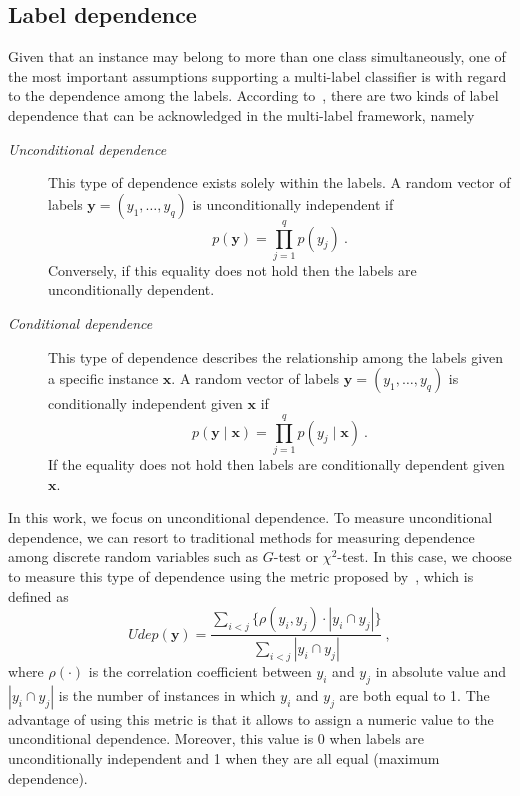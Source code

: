\documentclass[review]{elsarticle}
\begin{document}
	\subsection{Label dependence}
	
	Given that an instance may belong to more than one class simultaneously, one of the most important assumptions supporting a multi-label classifier is with regard to the dependence among the labels. According to~\citet{EG1}, there are two kinds of label dependence that can be acknowledged in the multi-label framework, namely
	\begin{description}
		\item[\it Unconditional dependence] This type of dependence exists solely within the labels. A random vector of labels $\mathbf{y} = \left(y_{1},\ldots,y_{q} \right)$ is unconditionally independent if
		\begin{equation} \label{UDEP}
		p(\mathbf{y}) = \prod^{q}_{j=1}{p(y_{j})}\ .
		\end{equation}
		Conversely, if this equality does not hold then the labels are unconditionally dependent.
		\item[\it Conditional dependence] This type of dependence describes the relationship among the labels given a specific instance $\mathbf{x}$. A random vector of labels $\mathbf{y} = \left(y_{1},\ldots,y_{q} \right)$ is conditionally independent given $\mathbf{x}$ if
		\begin{equation} \label{CDEP}
		p(\mathbf{y}\mid\mathbf{x}) = \prod^{q}_{j=1}{p(y_{j}\mid\mathbf{x})}\ .
		\end{equation}
		If the equality does not hold then labels are conditionally dependent given $\mathbf{x}$.
	\end{description}
	
	In this work, we focus on unconditional dependence. To measure unconditional dependence, we can resort to traditional methods for measuring dependence among discrete random variables such as $G$-test or $\chi^{2}$-test. In this case, we choose to measure this type of dependence using the metric proposed by~\citet{MLG1}, which is defined as
	\begin{equation}
	Udep(\mathbf{y}) = \frac{\sum_{i < j}\{\rho \left( {y}_{i}, {y}_{j} \right) \cdot | {y}_{i} \cap {y}_{j} |\}}{\sum_{i < j}{| {y}_{i} \cap {y}_{j} |}}\ ,
	\end{equation}
	where $\rho(\cdot)$ is the correlation coefficient between ${y}_{i}$ and ${y}_{j}$ in absolute value and $| {y}_{i} \cap {y}_{j} |$ is the number of instances in which $y_{i}$ and $y_{j}$ are both equal to 1. The advantage of using this metric is that it allows to assign a numeric value to the unconditional dependence. Moreover, this value is 0 when labels are unconditionally independent and 1 when they are all equal (maximum dependence).
	
\end{document}
